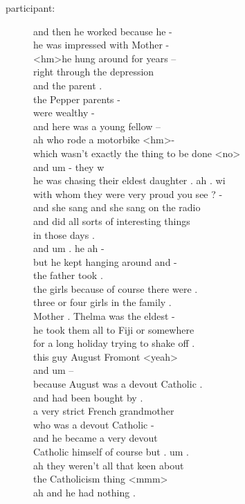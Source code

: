 \documentclass{article}
\newcommand{\turn}[2]{
\item[#1:] #2
}
\begin{document}
\begin{description}
\turn{participant}{and then he worked because he -\\
he was impressed with Mother -\\
\textless hm\textgreater  he hung around for years --\\
right through the depression\\
and the parent .\\
the Pepper parents -\\
were wealthy -\\
and here was a young fellow --\\
ah who rode a motorbike \textless hm\textgreater  -\\
which wasn't exactly the thing to be done \textless no\textgreater \\
and um - they w\\
he was chasing their eldest daughter . ah . wi\\
with whom they were very proud you see ? -\\
and she sang and she sang on the radio\\
and did all sorts of interesting things\\
in those days .\\
and um . he ah -\\
but he kept hanging around and -\\
the father took .\\
the girls because of course there were .\\
three or four girls in the family .\\
Mother . Thelma was the eldest -\\
he took them all to Fiji or somewhere\\
for a long holiday trying to shake off .\\
this guy August Fromont \textless yeah\textgreater \\
and um --\\
because August was a devout Catholic .\\
and had been bought by .\\
a very strict French grandmother\\
who was a devout Catholic -\\
and he became a very devout\\
Catholic himself of course but . um .\\
ah they weren't all that keen about\\
the Catholicism thing \textless mmm\textgreater \\
ah and he had nothing .\\
}
\end{description}
\end{document}
